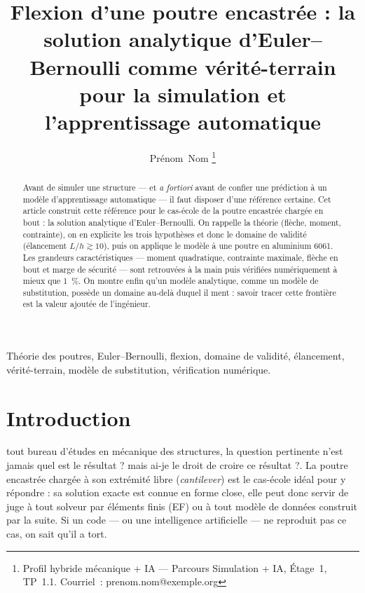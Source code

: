 \documentclass[10pt,journal]{IEEEtran}
\begin{document}
\title{Flexion d'une poutre encastrée : la solution analytique d'Euler--Bernoulli comme vérité-terrain pour la simulation et l'apprentissage automatique}

\author{Prénom~Nom%
\thanks{Profil hybride mécanique + IA --- Parcours Simulation + IA, Étage~1, TP~1.1. Courriel~: prenom.nom@exemple.org}}


\maketitle

\begin{abstract}
Avant de simuler une structure --- et \emph{a fortiori} avant de confier une prédiction à un modèle d'apprentissage automatique --- il faut disposer d'une référence certaine. Cet article construit cette référence pour le cas-école de la poutre encastrée chargée en bout : la solution analytique d'Euler--Bernoulli. On rappelle la théorie (flèche, moment, contrainte), on en explicite les trois hypothèses et donc le domaine de validité (élancement $L/h \gtrsim 10$), puis on applique le modèle à une poutre en aluminium 6061. Les grandeurs caractéristiques --- moment quadratique, contrainte maximale, flèche en bout et marge de sécurité --- sont retrouvées à la main puis vérifiées numériquement à mieux que 1~\%. On montre enfin qu'un modèle analytique, comme un modèle de substitution, possède un domaine au-delà duquel il ment : savoir tracer cette frontière est la valeur ajoutée de l'ingénieur.
\end{abstract}

\begin{IEEEkeywords}
Théorie des poutres, Euler--Bernoulli, flexion, domaine de validité, élancement, vérité-terrain, modèle de substitution, vérification numérique.
\end{IEEEkeywords}

\IEEEpeerreviewmaketitle

\section{Introduction}
 tout bureau d'études en mécanique des structures, la question pertinente n'est jamais \og quel est le résultat ?\fg{} mais \og ai-je le droit de croire ce résultat ?\fg{}. La poutre encastrée chargée à son extrémité libre (\emph{cantilever}) est le cas-école idéal pour y répondre : sa solution exacte est connue en forme close, elle peut donc servir de juge à tout solveur par éléments finis (EF) ou à tout modèle de données construit par la suite. Si un code --- ou une intelligence artificielle --- ne reproduit pas ce cas, on sait qu'il a tort.
\end{document}
